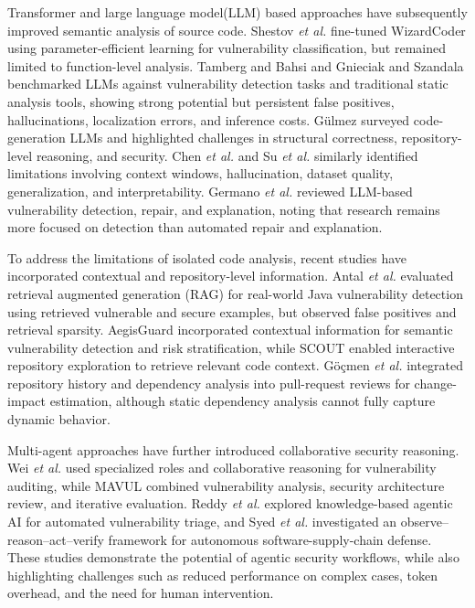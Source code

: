 \documentclass[conference]{IEEEtran}
\begin{document}
Transformer and large language model(LLM) based approaches have subsequently improved semantic analysis of source code. Shestov \textit{et al.} \cite{ref13} fine-tuned WizardCoder using parameter-efficient learning for vulnerability classification, but remained limited to function-level analysis. Tamberg and Bahsi and Gnieciak and Szandala \cite{ref14,ref17} benchmarked LLMs against vulnerability detection tasks and traditional static analysis tools, showing strong potential but persistent false positives, hallucinations, localization errors, and inference costs. Gülmez \cite{ref7} surveyed code-generation LLMs and highlighted challenges in structural correctness, repository-level reasoning, and security. Chen \textit{et al.} \cite{ref9} and Su \textit{et al.} \cite{ref8} similarly identified limitations involving context windows, hallucination, dataset quality, generalization, and interpretability. Germano \textit{et al.} \cite{ref10} reviewed LLM-based vulnerability detection, repair, and explanation, noting that research remains more focused on detection than automated repair and explanation.

To address the limitations of isolated code analysis, recent studies have incorporated contextual and repository-level information. Antal \textit{et al.} \cite{ref3} evaluated retrieval augmented generation (RAG) for real-world Java vulnerability detection using retrieved vulnerable and secure examples, but observed false positives and retrieval sparsity. AegisGuard \cite{ref1} incorporated contextual information for semantic vulnerability detection and risk stratification, while SCOUT\cite{ref5} enabled interactive repository exploration to retrieve relevant code context. Göçmen \textit{et al.} \cite{ref15} integrated repository history and dependency analysis into pull-request reviews for change-impact estimation, although static dependency analysis cannot fully capture dynamic behavior.

Multi-agent approaches have further introduced collaborative security reasoning. Wei \textit{et al.} \cite{ref11} used specialized roles and collaborative reasoning for vulnerability auditing, while MAVUL \cite{ref16} combined vulnerability analysis, security architecture review, and iterative evaluation. Reddy \textit{et al.} \cite{ref6} explored knowledge-based agentic AI for automated vulnerability triage, and Syed \textit{et al.} \cite{ref12} investigated an observe--reason--act--verify framework for autonomous software-supply-chain defense. These studies demonstrate the potential of agentic security workflows, while also highlighting challenges such as reduced performance on complex cases, token overhead, and the need for human intervention.
\end{document}
